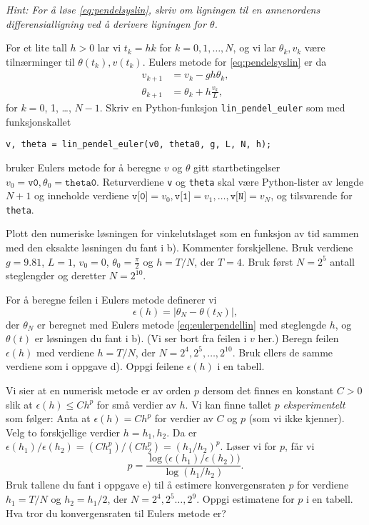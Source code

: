 \documentclass[11pt,norsk,a4paper]{article}
\begin{document}
\begin{oppgaver}
\begin{deloppgaver}
\noindent
\textit{Hint: For å løse \eqref{eq:pendelsyslin}, skriv om ligningen til en annenordens differensialligning ved å derivere ligningen for $\theta$.}

\oppgave
For et lite tall $h>0$ lar vi $t_k = hk$ for $k=0,1,\dots,N$, og vi lar $\theta_k, v_k$ være tilnærminger til $\theta(t_k), v(t_k)$. Eulers metode for \eqref{eq:pendelsyslin} er da
\begin{equation}\label{eq:eulerpendellin}
\begin{split}
v_{k+1} &= v_k - gh\theta_k, \\
\theta_{k+1} &= \theta_k + h\frac{v_k}{L},
\end{split}
\end{equation}
for $k=0$, 1, \dots, $N-1$.
Skriv en Python-funksjon \verb|lin_pendel_euler| som med funksjonskallet 
\begin{verbatim}
v, theta = lin_pendel_euler(v0, theta0, g, L, N, h);
\end{verbatim}
bruker Eulers metode for å beregne $v$ og $\theta$ gitt startbetingelser $v_0=\texttt{v0}, \theta_0=\texttt{theta0}$. Returverdiene \texttt{v} og \texttt{theta} skal være Python-lister av lengde $N+1$ og inneholde verdiene $\texttt{v[0]}=v_0, \texttt{v[1]}=v_1, \dots, \texttt{v[N]}=v_N$, og tilsvarende for \texttt{theta}.

\oppgave
Plott den numeriske løsningen for vinkelutslaget som en funksjon av tid sammen med den eksakte løsningen du fant i b). Kommenter forskjellene. Bruk verdiene $g=9.81$, $L=1$, $v_0=0$, $\theta_0=\frac{\pi}{2}$ og $h = T/N$, der $T=4$. Bruk først $N=2^{5}$ antall steglengder og deretter $N=2^{10}$.

\oppgave
For å beregne feilen i Eulers metode definerer vi 
\[
\epsilon(h) = |\theta_N-\theta(t_N)|,
\]
der $\theta_N$ er beregnet med Eulers metode \eqref{eq:eulerpendellin} med steglengde $h$, og $\theta(t)$ er løsningen du fant i b). (Vi ser bort fra feilen i $v$ her.) Beregn feilen $\epsilon(h)$ med verdiene $h=T/N$, der $N=2^{4},2^{5},\dots,2^{10}$. Bruk ellers de samme verdiene som i oppgave d). Oppgi feilene $\epsilon(h)$ i en tabell.

\oppgave
Vi sier at en numerisk metode er av orden $p$ dersom det finnes en konstant $C>0$ slik at $\epsilon(h) \leq Ch^p$ for små verdier av $h$. Vi kan finne tallet $p$ \emph{eksperimentelt} som følger: Anta at $\epsilon(h)=Ch^p$ for verdier av $C$ og $p$ (som vi ikke kjenner). Velg to forskjellige verdier $h=h_1,h_2$. Da er $\epsilon(h_1)/\epsilon(h_2) = (Ch_1^p)/(Ch_2^p) = (h_1/h_2)^p$. Løser vi for $p$, får vi
\[
p = \frac{\log\big(\epsilon(h_1)/\epsilon(h_2)\big)}{\log(h_1/h_2)}.
\]
Bruk tallene du fant i oppgave e) til å estimere konvergensraten $p$ for verdiene $h_1=T/N$ og $h_2=h_1/2$, der $N=2^{4},2^5\dots,2^{9}$. Oppgi estimatene for $p$ i en tabell. Hva tror du konvergensraten til Eulers metode er?


\end{deloppgaver}
\end{oppgaver}
\end{document}
